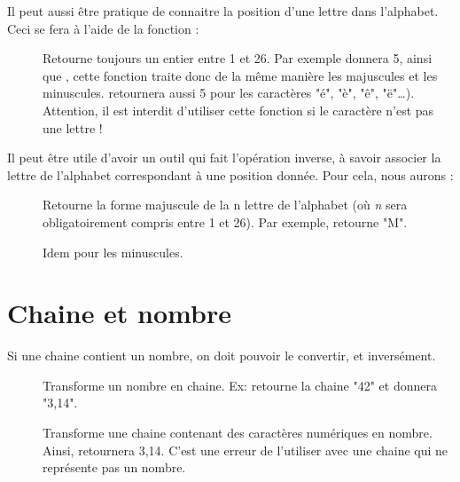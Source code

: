 	Il peut aussi être pratique de connaitre 
	la position d'une lettre dans l'alphabet. 
	Ceci se fera à l'aide de la fonction :

	\begin{description}
	\item[]
		Retourne toujours un entier entre 1 et 26. 
		Par exemple  donnera 5, 
		ainsi que , 
		cette fonction traite donc de la même manière 
		les majuscules et les minuscules. 
		 retournera aussi 5 pour les caractères "é", "è", "ê", "ë"\dots). 
		Attention, il est interdit d'utiliser cette fonction 
		si le caractère n'est pas une lettre !
	\end{description}
	
	Il peut être utile d'avoir un outil qui fait l'opération inverse, 
	à savoir associer la lettre de l'alphabet correspondant à une position donnée. 
	Pour cela, nous aurons : 

	\begin{description}
	\item[]
		Retourne la forme majuscule de la n\ieme{} lettre de l'alphabet 
		(où \textit{n} sera obligatoirement compris entre 1 et 26). 
		Par exemple,  retourne "M".
	\item[]
		Idem pour les minuscules.
	\end{description}
	
\section{Chaine et nombre}

	Si une chaine contient un nombre,
	on doit pouvoir le convertir, et inversément.

	\begin{description}
	\item[]
		Transforme un nombre en chaine.
		Ex:  retourne la chaine "42"
		et  donnera "3,14". 
	\item[]
		Transforme une chaine contenant des caractères numériques 
		en nombre.
		Ainsi,  retournera 3,14. 
		C'est une erreur de l'utiliser avec une chaine
		qui ne représente pas un nombre.
	\end{description}
	
